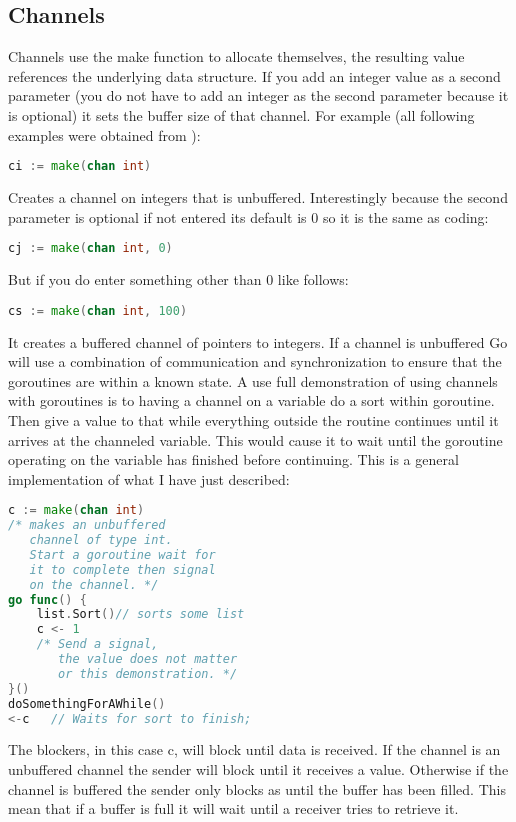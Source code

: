 \subsection{Channels}
Channels use the make function to allocate themselves, the resulting value references the underlying data structure. If you add an integer value as a second parameter (you do not have to add an integer as the second parameter because it is optional) it sets the buffer size of that channel. For example (all following examples were obtained from \cite{website:go-lang-documentation}):
\begin{lstlisting}[language=Go]
ci := make(chan int)
\end{lstlisting}
Creates a channel on integers that is unbuffered. Interestingly because the second parameter is optional if not entered its default is 0 so it is the same as coding:
\begin{lstlisting}[language=Go]
cj := make(chan int, 0)
\end{lstlisting}
But if you do enter something other than 0 like follows:
\begin{lstlisting}[language=Go]
cs := make(chan int, 100)
\end{lstlisting}
It creates a buffered channel of pointers to integers.
If a channel is unbuffered Go will use a combination of communication and synchronization to ensure that the goroutines are within a known state.  A use full demonstration of using channels with goroutines is to having a channel on a variable do a sort within goroutine. Then give a value to that while everything outside the routine continues until it arrives at the channeled variable. This would cause it to wait until the goroutine operating on the variable has finished before continuing.  This is a general implementation of what I have just described:
\begin{lstlisting}[language=Go]
c := make(chan int)
/* makes an unbuffered
   channel of type int.
   Start a goroutine wait for
   it to complete then signal
   on the channel. */
go func() {
    list.Sort()// sorts some list
    c <- 1
    /* Send a signal,
       the value does not matter
       or this demonstration. */
}()
doSomethingForAWhile()
<-c   // Waits for sort to finish;
\end{lstlisting}
The blockers, in this case c, will block until data is received. If the channel is an unbuffered channel the sender will block until it receives a value. Otherwise if the channel is buffered the sender only blocks as until the buffer has been filled. This mean that if a buffer is full it will wait until a receiver tries to retrieve it.
